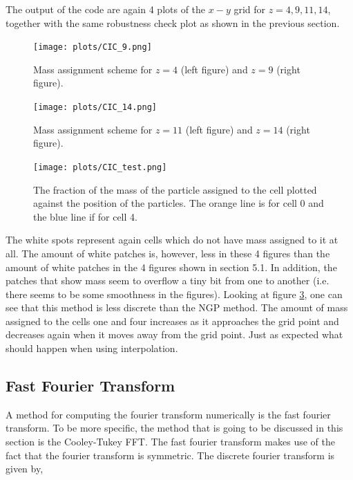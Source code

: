 

The output of the code are again 4 plots of the $x - y$ grid for $z = 4,9,11,14$, together with the same robustness check plot as shown in the previous section.

\begin{figure}[h]
\centering
\texttt{[image: plots/CIC\_9.png]}
\caption{Mass assignment scheme for $z = 4$ (left figure) and $z = 9$ (right figure).}
\label{cic1}
\end{figure}

\begin{figure}[h]
\centering
\texttt{[image: plots/CIC\_14.png]}
\caption{Mass assignment scheme for $z = 11$ (left figure) and $z = 14$ (right figure).}
\label{cic2}
\end{figure}

\begin{figure}[h]
\centering
\texttt{[image: plots/CIC\_test.png]}
\caption{The fraction of the mass of the particle assigned to the cell plotted against the position of the particles. The orange line is for cell 0 and the blue line if for cell 4.}
\label{cic_test}
\end{figure}

The white spots represent again cells which do not have mass assigned to it at all. The amount of white patches is, however, less in these 4 figures than the amount of white patches in the 4 figures shown in section 5.1. In addition, the patches that show mass seem to overflow a tiny bit from one to another (i.e. there seems to be some smoothness in the figures). Looking at figure \ref{cic_test}, one can see that this method is less discrete than the NGP method. The amount of mass assigned to the cells one and four increases as it approaches the grid point and decreases again when it moves away from the grid point. Just as expected what should happen when using interpolation.
\clearpage

\subsection{Fast Fourier Transform}

A method for computing the fourier transform numerically is the fast fourier transform. To be more specific, the method that is going to be discussed in this section is the Cooley-Tukey FFT. The fast fourier transform makes use of the fact that the fourier transform is symmetric. The discrete fourier transform is given by,

